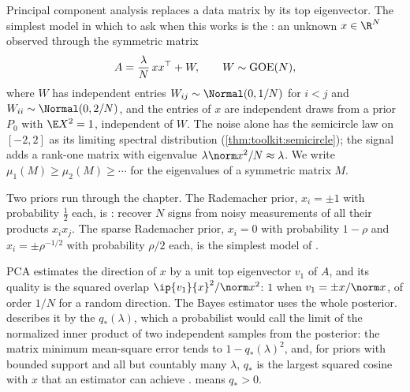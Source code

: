 \begin{refsection}
Principal component analysis replaces a data matrix by its top eigenvector. The simplest model in which to ask when this works is the : an unknown $x\in\R^N$ observed through the symmetric matrix
\begin{equation}\label{eq:spiked:model}
A=\frac\lambda N\,xx^\top+W,\qquad W\sim\mathrm{GOE}(N),
\end{equation}
where $W$ has independent entries $W_{ij}\sim\Normal(0,1/N)$ for $i<j$ and $W_{ii}\sim\Normal(0,2/N)$, and the entries of $x$ are independent draws from a prior $P_0$ with $\E X^2=1$, independent of $W$. The noise alone has the semicircle law on $[-2,2]$ as its limiting spectral distribution (\cref{thm:toolkit:semicircle}); the signal adds a rank-one matrix with eigenvalue $\lambda\norm x^2/N\approx\lambda$. We write $\mu_1(M)\ge\mu_2(M)\ge\cdots$ for the eigenvalues of a symmetric matrix $M$.

Two priors run through the chapter. The Rademacher prior, $x_i=\pm1$ with probability $\frac12$ each, is : recover $N$ signs from noisy measurements of all their products $x_ix_j$. The sparse Rademacher prior, $x_i=0$ with probability $1-\rho$ and $x_i=\pm\rho^{-1/2}$ with probability $\rho/2$ each, is the simplest model of .

PCA estimates the direction of $x$ by a unit top eigenvector $v_1$ of $A$, and its quality is the squared overlap $\ip{v_1}{x}^2/\norm x^2$: $1$ when $v_1=\pm x/\norm x$, of order $1/N$ for a random direction. The Bayes estimator uses the whole posterior.  describes it by the  $q_*(\lambda)$, which a probabilist would call the limit of the normalized inner product of two independent samples from the posterior: the matrix minimum mean-square error tends to $1-q_*(\lambda)^2$, and, for priors with bounded support and all but countably many $\lambda$, $q_*$ is the largest squared cosine with $x$ that an estimator can achieve \parencite[Proposition~2.2]{MontanariVenkataramanan2021}.  means $q_*>0$.


\end{refsection}
